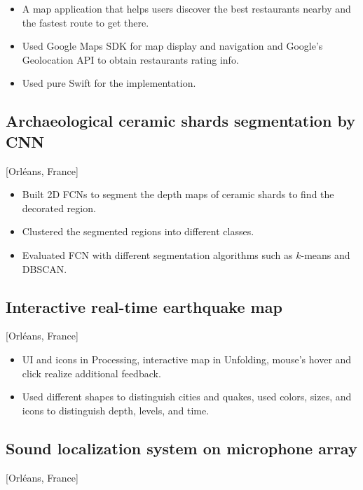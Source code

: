 \documentclass{mycv}
\begin{document}
\begin{itemize}
  \item A map application that helps users discover the best restaurants nearby and the fastest route to get there.
  \item Used Google Maps SDK for map display and navigation and Google's Geolocation API to obtain restaurants rating info.
  \item Used pure Swift for the implementation.
\end{itemize}

\subsection{Archaeological ceramic shards segmentation by CNN}[Orl\'eans, France]
\begin{positions}
\end{positions}

\begin{itemize}
    \item Built 2D FCNs to segment the depth maps of ceramic shards to find the decorated region.
    \item Clustered the segmented regions into different classes.
    \item Evaluated FCN with different segmentation algorithms such as $k$-means and DBSCAN.
\end{itemize}

\subsection{Interactive real-time earthquake map}[Orl\'eans, France]
\begin{positions}
\end{positions}

\begin{itemize}
  \item UI and icons in Processing, interactive map in  Unfolding, mouse's hover and click realize additional feedback.
  \item Used different shapes to distinguish cities and quakes, used colors, sizes, and icons to distinguish depth, levels, and time.
\end{itemize}

\subsection{Sound localization system on microphone array}[Orl\'eans, France]
\begin{positions}
\end{positions}
\end{document}

